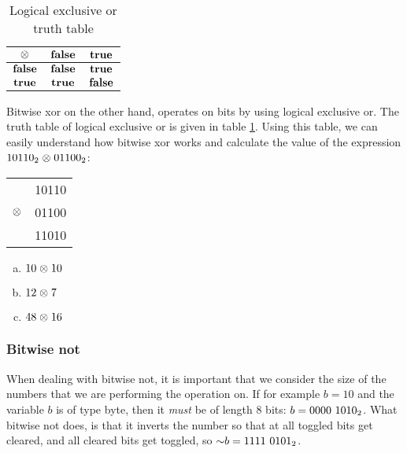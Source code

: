 \begin{table}
  \centering
  \begin{tabular}{|c|c|c|}
    \hline
    $\mathbf{\mathrel{\otimes}}$ & $\mathbf{\textbf{false}}$ & $\mathbf{\textbf{true}}$ \\ \hline
    $\mathbf{\textbf{false}}$ & $\mathbf{\textbf{false}}$ & $\mathbf{\textbf{true}}$ \\ \hline
    $\mathbf{\textbf{true}}$ & $\mathbf{\textbf{true}}$ & $\mathbf{\textbf{false}}$ \\ \hline
  \end{tabular}
  \caption{Logical exclusive or truth table}
  \label{tab:log-exlusive-or-table}
\end{table}

Bitwise xor on the other hand, operates on bits by using logical
exclusive or. The truth table of logical exclusive or is given in
table \ref{tab:log-exlusive-or-table}. Using this table, we can easily
understand how bitwise xor works and calculate the value of the
expression $\mbox{\ensuremath{10110_2}} \mathrel{\otimes} \mbox{\ensuremath{01100_2}}$:

\begin{center}
  \begin{tabular}{lr}
    & 10110  \\
    $\mathrel{\otimes}$ & 01100 \\
    \hline
    & 11010 \\
  \end{tabular}
\end{center}

\begin{Exercise}[label={bitxor}]
  \begin{enumerate}[(a)]
  \item $10 \mathrel{\otimes} 10$
  \item $12 \mathrel{\otimes} 7$
  \item $48 \mathrel{\otimes} 16$
  \end{enumerate}
\end{Exercise}

\subsubsection{Bitwise not}

When dealing with bitwise not, it is important that we consider the
size of the numbers that we are performing the operation on. If for
example $b=10$ and the variable $b$ is of type byte, then it
\textit{must} be of length 8 bits: $b=\mbox{\ensuremath{0000\ 1010_2}}$. What bitwise not
does, is that it inverts the number so that at all toggled bits get
cleared, and all cleared bits get toggled, so $\mathord{\sim} b = \mbox{\ensuremath{1111\
0101_2}}$.

